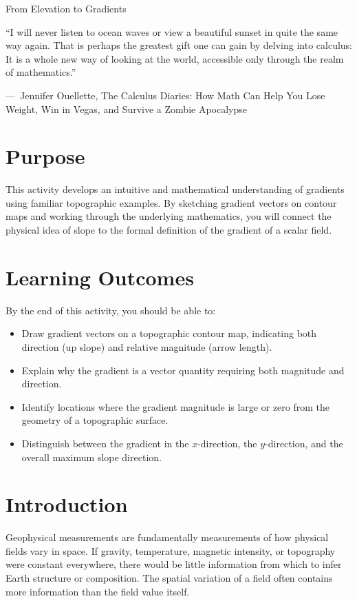 \begin{activity}{From Elevation to Gradients}

\epigraph{ ``I will never listen to ocean waves or view a beautiful sunset in quite the same way again. That is perhaps the greatest gift one can gain by delving into calculus: It is a whole new way of looking at the world, accessible only through the realm of mathematics.''}
{{\normalfont ---\ Jennifer Ouellette}, The Calculus Diaries: How Math Can Help You Lose Weight, Win in Vegas, and Survive a Zombie Apocalypse}

\section*{Purpose}

This activity develops an intuitive and mathematical understanding of gradients using familiar topographic examples. By sketching gradient vectors on contour maps and working through the underlying mathematics, you will connect the physical idea of slope to the formal definition of the gradient of a scalar field.

\section*{Learning Outcomes}

By the end of this activity, you should be able to:
\begin{itemize}
  \item Draw gradient vectors on a topographic contour map, indicating both direction (up slope) and relative magnitude (arrow length).
  \item Explain why the gradient is a vector quantity requiring both magnitude and direction.
  \item Identify locations where the gradient magnitude is large or zero from the geometry of a topographic surface.
  \item Distinguish between the gradient in the $x$-direction, the $y$-direction, and the overall maximum slope direction.
\end{itemize}

\section*{Introduction}
Geophysical measurements are fundamentally measurements of how physical fields vary in space. If gravity, temperature, magnetic intensity, or topography were constant everywhere, there would be little information from which to infer Earth structure or composition. The spatial variation of a field often contains more information than the field value itself.


\end{activity}
